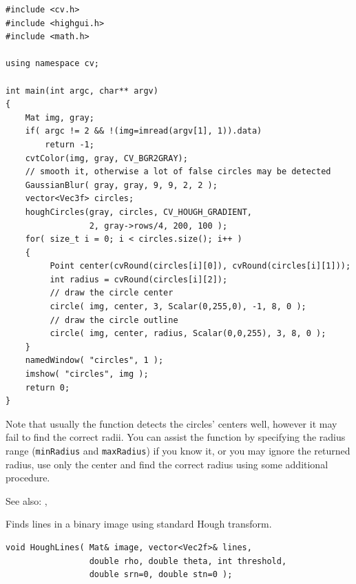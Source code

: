 \begin{lstlisting}
#include <cv.h>
#include <highgui.h>
#include <math.h>

using namespace cv;

int main(int argc, char** argv)
{
    Mat img, gray;
    if( argc != 2 && !(img=imread(argv[1], 1)).data)
        return -1;
    cvtColor(img, gray, CV_BGR2GRAY);
    // smooth it, otherwise a lot of false circles may be detected
    GaussianBlur( gray, gray, 9, 9, 2, 2 );
    vector<Vec3f> circles;
    houghCircles(gray, circles, CV_HOUGH_GRADIENT,
                 2, gray->rows/4, 200, 100 );
    for( size_t i = 0; i < circles.size(); i++ )
    {
         Point center(cvRound(circles[i][0]), cvRound(circles[i][1]));
         int radius = cvRound(circles[i][2]);
         // draw the circle center
         circle( img, center, 3, Scalar(0,255,0), -1, 8, 0 );
         // draw the circle outline
         circle( img, center, radius, Scalar(0,0,255), 3, 8, 0 );
    }
    namedWindow( "circles", 1 );
    imshow( "circles", img );
    return 0;
}
\end{lstlisting}

Note that usually the function detects the circles' centers well, however it may fail to find the correct radii. You can assist the function by specifying the radius range (\texttt{minRadius} and \texttt{maxRadius}) if you know it, or you may ignore the returned radius, use only the center and find the correct radius using some additional procedure.

See also: , 

\label{HoughLines}
Finds lines in a binary image using standard Hough transform.

\begin{lstlisting}
void HoughLines( Mat& image, vector<Vec2f>& lines,
                 double rho, double theta, int threshold,
                 double srn=0, double stn=0 );
\end{lstlisting}
\begin{description}
\end{description}

